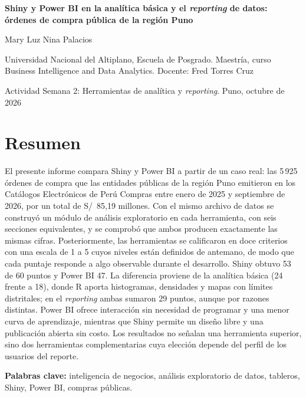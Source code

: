 \documentclass[12pt,a4paper]{article}
\begin{document}
\thispagestyle{plain}
\begin{center}
{\large\bfseries Shiny y Power BI en la analítica básica y el \emph{reporting} de datos:\\
órdenes de compra pública de la región Puno\par}
\vspace{10pt}
{Mary Luz Nina Palacios\par}
{\small Universidad Nacional del Altiplano, Escuela de Posgrado. Maestría, curso Business Intelligence and
Data Analytics. Docente: Fred Torres Cruz\par}
{\small Actividad Semana 2: Herramientas de analítica y \emph{reporting}. Puno, octubre de 2026\par}
\end{center}
\vspace{4pt}

\section*{Resumen}
\noindent El presente informe compara Shiny y Power BI a partir de un caso real: las 5\,925 órdenes de compra que
las entidades públicas de la región Puno emitieron en los Catálogos Electrónicos de Perú Compras entre
enero de 2025 y septiembre de 2026, por un total de S/~85,19 millones. Con el mismo archivo de datos se
construyó un módulo de análisis exploratorio en cada herramienta, con seis secciones equivalentes, y se
comprobó que ambos producen exactamente las mismas cifras. Posteriormente, las herramientas se calificaron en doce
criterios con una escala de 1 a 5 cuyos niveles están definidos de antemano, de modo que cada puntaje
responde a algo observable durante el desarrollo. Shiny obtuvo 53 de 60 puntos y Power BI 47. La diferencia
proviene de la analítica básica (24 frente a 18), donde R aporta histogramas, densidades y mapas con
límites distritales; en el \emph{reporting} ambas sumaron 29 puntos, aunque por razones distintas. Power BI
ofrece interacción sin necesidad de programar y una menor curva de aprendizaje, mientras que Shiny permite
un diseño libre y una publicación abierta sin costo. Los resultados no señalan una herramienta superior,
sino dos herramientas complementarias cuya elección depende del perfil de los usuarios del reporte.

\medskip\noindent\textbf{Palabras clave:} inteligencia de negocios, análisis exploratorio de datos,
tableros, Shiny, Power BI, compras públicas.
\end{document}
